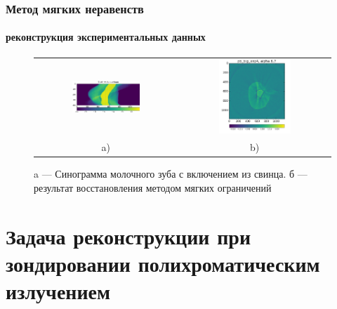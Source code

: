 \documentclass[12pt]{beamer}
\begin{document}
\begin{frame}
\frametitle{Метод мягких неравенств}
\framesubtitle{реконструкция экспериментальных данных}

\begin{figure}
\centering
\vspace{-0.3cm}
\begin{tabular}{@{}c@{}c}
    \includegraphics[width=0.50\textwidth]{../Dissertation/images/part2_img/tooth_sino}
&
    \includegraphics[width=0.50\textwidth]{../Dissertation/images/part2_img/soft_ineq_pb_tooth}
\\
   \small a) & \small b)
\end{tabular}
  \caption{a --- Синограмма молочного зуба с включением из свинца. б --- результат восстановления методом мягких ограничений}
\label{fig:tooth_sino_rec}
\end{figure}

\end{frame}

\section{Задача реконструкции при зондировании полихроматическим излучением}
\end{document}
